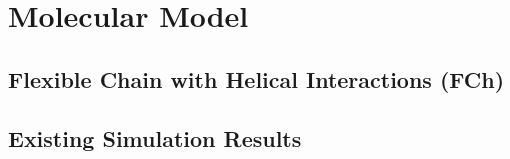 
\chapter{Molecular Model}

\section{Flexible Chain with Helical Interactions (FCh)}

\section{Existing Simulation Results}
